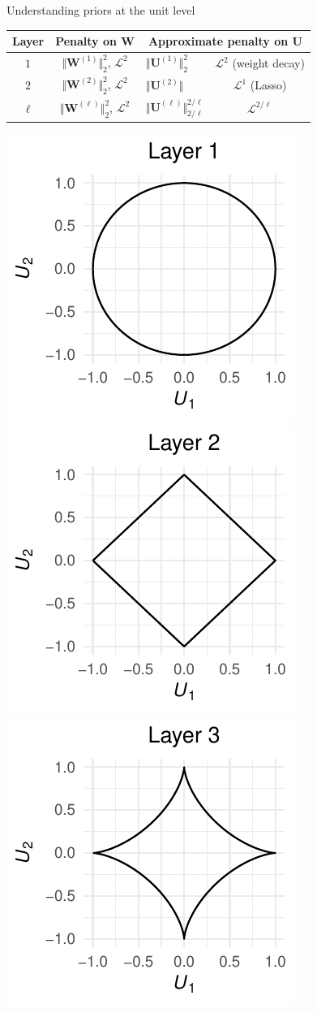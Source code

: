 \documentclass[9pt,handout]{beamer}
\begin{document}
\begin{frame}{Understanding priors at the unit level}


\def\bW{\boldsymbol{W}}
\def\bU{\boldsymbol{U}}
\def\Lnorm{\mathcal{L}}

\begin{center}
\begin{tabular}{@{}cclc@{}}
\toprule
Layer                         & Penalty on $\bW$         & \multicolumn{2}{c}{Approximate penalty on $\bU$}         \\ \toprule
$1$ & $\Vert \bW^{(1)}\Vert_2^{2}$, $\Lnorm^2$   & $\Vert \bU^{(1)}\Vert_2^{2}$ & $\Lnorm^2$  (weight decay)\\%
$2$ & $\Vert \bW^{(2)}\Vert_2^{2}$, $\Lnorm^2$   & $\Vert \bU^{(2)}\Vert$ & $\Lnorm^1$  (Lasso)\\%
$\ell$ & $\Vert \bW^{(\ell)}\Vert_2^{2}$, $\Lnorm^2$   & $\Vert \bU^{(\ell)}\Vert_{2/\ell}^{2/\ell}$ & $\Lnorm^{2/\ell}$ \\ 
\bottomrule
\end{tabular}\bigskip 

  \includegraphics[width=.32\textwidth]{figures_julyan/bdl/001}
  \includegraphics[width=.32\textwidth]{figures_julyan/bdl/002}
  \includegraphics[width=.32\textwidth]{figures_julyan/bdl/003}

\end{center}

\end{frame}
\end{document}
